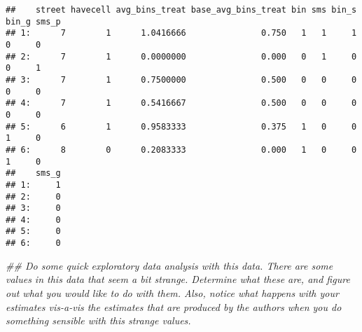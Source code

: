 \documentclass[
]{article}
\newenvironment{Shaded}{\begin{snugshade}}{\end{snugshade}}
\newcommand{\CommentTok}[1]{\textcolor[rgb]{0.56,0.35,0.01}{\textit{#1}}}
\begin{document}
\begin{verbatim}
##    street havecell avg_bins_treat base_avg_bins_treat bin sms bin_s bin_g sms_p
## 1:      7        1      1.0416666               0.750   1   1     1     0     0
## 2:      7        1      0.0000000               0.000   0   1     0     0     1
## 3:      7        1      0.7500000               0.500   0   0     0     0     0
## 4:      7        1      0.5416667               0.500   0   0     0     0     0
## 5:      6        1      0.9583333               0.375   1   0     0     1     0
## 6:      8        0      0.2083333               0.000   1   0     0     1     0
##    sms_g
## 1:     1
## 2:     0
## 3:     0
## 4:     0
## 5:     0
## 6:     0
\end{verbatim}

\begin{Shaded}
\begin{Highlighting}[]
\CommentTok{## Do some quick exploratory data analysis with this data. There are some values in this data that seem a bit strange. Determine what these are, and figure out what you would like to do with them. Also, notice what happens with your estimates vis-a-vis the estimates that are produced by the authors when you do something sensible with this strange values. }
\end{Highlighting}
\end{Shaded}
\end{document}
